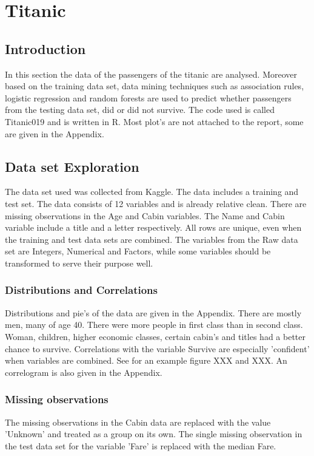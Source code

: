 \documentclass{article}
\begin{document}
\section{Titanic}
\subsection{Introduction}

In this section the data of the passengers of the titanic are analysed. Moreover based on the training data 
set, data mining techniques such as association rules, logistic regression and random forests are used to 
predict whether passengers from the testing data set, did or did not survive. The code used is called 
Titanic019 and is written in R. Most plot's are not attached to the report, some are given in the Appendix.

\subsection{Data set Exploration}
The data set used was collected from Kaggle. The data includes a training and test set. The data consists of 12
variables and is already relative clean. There are missing observations in the Age and Cabin variables. The 
Name and Cabin variable include a title and a letter respectively. All rows are unique, even when the training 
and test data sets are combined.
The variables from the Raw data set are Integers, Numerical and Factors, while some variables should be 
transformed to serve their purpose well.

\subsubsection{Distributions and Correlations}
Distributions and pie's of the data are given in the Appendix. There are mostly men, many of age 40. There were more people in first class than in second class.  Woman, children, higher economic classes, certain cabin's and titles had a better chance to survive. Correlations with the variable Survive are especially 'confident' when variables are combined. See for an example figure XXX and XXX. An correlogram is also given in the Appendix.

\subsubsection{Missing observations}

The missing observations in the Cabin data are replaced with the value 'Unknown' and treated as a group on its 
own. The single missing observation in the test data set for the variable 'Fare' is replaced with the median 
Fare. 
\end{document}
